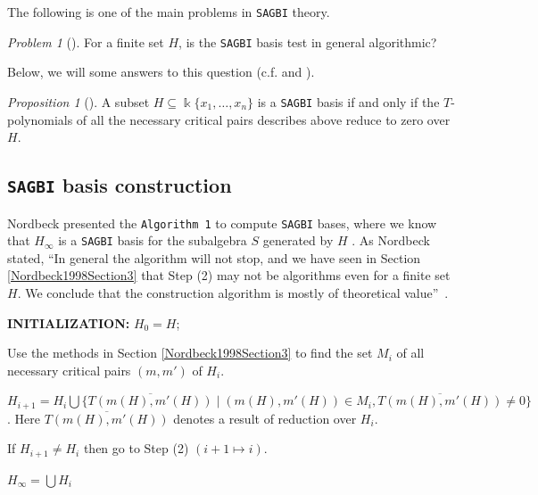 \documentclass{amsart}
\theoremstyle{definition}
\theoremstyle{remark}
\newtheorem{proposition}[theorem]{Proposition}
\newtheorem{problem}{Problem}[section]
\numberwithin{equation}{section}
\begin{document}
The following is one of the main problems in \texttt{SAGBI} theory.

\begin{problem}[{\cite[p. 144]{Nordbeck1998}}]\label{Nordbeck1998Problemp.144}
    For a finite set $H$, is the \texttt{SAGBI} basis test in general algorithmic?
\end{problem}

Below, we will some answers to this question (c.f. \cite[Proposition 6.1.3]{KreuzerRobbiano2005} and \cite[Theorem 6.6.29]{KreuzerRobbiano2005}).

\begin{proposition}[{\cite[Theorem 1]{Nordbeck1998}}]
    A subset $H\subseteq \Bbbk \{ x_1,\dotsc, x_n \}$ is a {\rm \texttt{SAGBI}} basis if and only if the $T$-polynomials of all the necessary critical pairs describes above reduce to zero over $H$.
\end{proposition}


\subsection{\texttt{SAGBI} basis construction}

Nordbeck \cite{Nordbeck1998} presented the \texttt{Algorithm 1} to compute \texttt{SAGBI} bases, where we know that $H_{\infty}$ is a \texttt{SAGBI} basis for the subalgebra $S$ generated by $H$ \cite[Proposition 12]{Nordbeck1998}. As Nordbeck stated, \textquotedblleft In general the algorithm will not stop, and we have seen in Section \ref{Nordbeck1998Section3} that Step (2) may not be algorithms even for a finite set $H$. We conclude that the construction algorithm is mostly of theoretical value\textquotedblright\ \cite[p. 146]{Nordbeck1998}.

\begin{algorithm}\label{Algorithm1Nordbeck}
\caption{}
\textbf{INITIALIZATION:} $H_0 = H$; 

\BlankLine

Use the methods in Section \ref{Nordbeck1998Section3} to find the set $M_i$ of all necessary critical pairs $(m, m')$ of $H_i$.

\BlankLine

$H_{i+1} = H_i\bigcup \{\overline{T(m(H), m'(H))} \mid (m(H), m'(H)) \in M_i, \overline{T(m(H), m'(H))} \neq 0\}$. Here $\overline{T(m(H), m'(H))}$ denotes a result of reduction over $H_i$.

\BlankLine

If $H_{i+1} \neq H_i$ then go to Step (2) $(i + 1 \mapsto i)$.

\BlankLine

$H_{\infty} = \bigcup H_i$
\end{algorithm}
\end{document}
